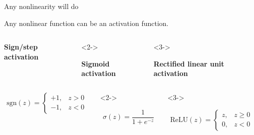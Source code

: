 \documentclass[9pt]{beamer}
\begin{document}
\begin{frame}{Any nonlinearity will do}

Any nonlinear function can be an activation function.

\begin{columns}[T]
\begin{column}{0.3\textwidth}
	\begin{center}
		\textbf{Sign/step activation}
	\end{center}
\end{column}	
\begin{column}{0.3\textwidth}<2->
	\begin{center}
		\textbf{Sigmoid activation}
	\end{center}
\end{column}	
\begin{column}{0.3\textwidth}<3->
	\begin{center}
		\textbf{Rectified linear unit activation}
	\end{center}
\end{column}	
\end{columns}

\begin{columns}[T]
\begin{column}{0.3\textwidth}
	\begin{center}
		\[ \mathrm{sgn}(z) = \begin{cases} +1, & z > 0 \\ -1, & z < 0 \end{cases} \]
	\end{center}
\end{column}	
\begin{column}{0.3\textwidth}<2->
	\begin{center}
		\[ \sigma(z) = \frac{1}{1 + e^{-z}} \]
	\end{center}
\end{column}	
\begin{column}{0.3\textwidth}<3->
	\begin{center}
		\[ \mathrm{ReLU}(z) = \begin{cases} z, & z \ge 0 \\ 0, & z < 0 \end{cases} \]
	\end{center}
\end{column}	
\end{columns}


\begin{columns}[T]
\begin{column}{0.3\textwidth}
	\begin{center}
	\end{center}
\end{column}


\end{columns}
\end{frame}
\end{document}
